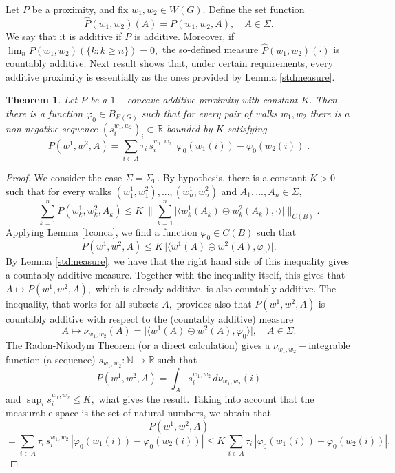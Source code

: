 \documentclass[preprint,12pt]{elsarticle}
\newtheorem{theorem}{Theorem}[section]
\begin{document}
Let $P$ be a proximity, and fix $w_1, w_2 \in W(G).$ Define the set function
$$
\widehat P(w_1,w_2)(A)= P(w_1,w_2,A), \quad A \in \Sigma.
$$
We say that it is additive if $P$ is additive. Moreover, if $\lim_n P(w_1,w_2)(\{k: k \ge n\})=0,$ the so-defined measure $\widehat P(w_1,w_2)(\cdot)$ is countably additive.
Next result shows that, under certain requirements, every additive proximity is essentially as the ones provided by Lemma \ref{stdmeasure}.


\begin{theorem} \label{main1con}
Let $P$ be a $1-$concave additive proximity with constant $K.$ Then  there is a function $\varphi_0 \in B_{E(G)}$ such that
 for every pair of walks $w_1,w_2$ there is a non-negative sequence $(s^{w_1,w_2}_i)_i {\subset\mathbb R}$ bounded by $K$ satisfying 
$$
P(w^1,w^2, A) = \sum_{i \in A} \tau_i \, s^{w_1,w_2}_i \, \big| \varphi_0(w_1(i))- \varphi_0(w_2(i)) \big|. 
$$
\end{theorem}
\begin{proof}
We consider the case $\Sigma= \Sigma_0.$ By hypothesis, there is a constant $K>0$ such that for every walks $(w^1_1,w^2_1), ..., (w^1_n, w^2_n)$ and $A_1,...,A_n \in \Sigma,$
$$
\sum_{k=1}^n P(w^1_k,w^2_k, A_k) \le K \ \Big\|
 \sum_{k=1}^n \big| \langle w^1_k(A_k) \circleddash w^2_k(A_k), \cdot \rangle \big| \Big\|_{C(B)}.
$$
Applying Lemma \ref{1conca}, we find a function $\varphi_0 \in C(B)$ such that 
$$
P(w^1,w^2, A) \le K \, \big| \langle w^1(A) \circleddash w^2(A), \varphi_0 \rangle \big|.
$$
By Lemma \ref{stdmeasure}, we have that the right hand side of this inequality gives a countably additive measure. Together with the inequality itself, this gives that $A \mapsto P(w^1,w^2, A),$ which is already additive, is also countably additive. The inequality, that works for all subsets $A,$ provides also that $P(w^1,w^2, A)$ is countably additive with respect to the (countably additive) measure
$$
A \mapsto \nu_{w_1,w_2}(A)=\big| \langle w^1(A) \circleddash w^2(A), \varphi_0 \rangle \big|, \quad A \in \Sigma.
$$
The Radon-Nikodym Theorem (or a direct calculation) gives a $\nu_{w_1,w_2}-$integrable function (a sequence) $s_{w_1,w_2}: \mathbb N \to \mathbb R$ such that
$$
P(w^1,w^2, A)= \int_A s^{w_1,w_2}_i \, d\nu_{w_1,w_2}(i)
$$
and $\sup_i s^{w_1,w_2}_i \le K,$
what gives the result. Taking into account that the measurable space is the set of natural numbers, we obtain that
$$
P(w^1,w^2, A)
$$
$$
= \sum_{i \in A} \tau_i \, s^{w_1,w_2}_i \, | \varphi_0(w_1(i))- \varphi_0(w_2(i)) | \le K \,
\sum_{i \in A} \tau_i \,  | \varphi_0(w_1(i))- \varphi_0(w_2(i)) | .
$$

\end{proof}
\end{document}

